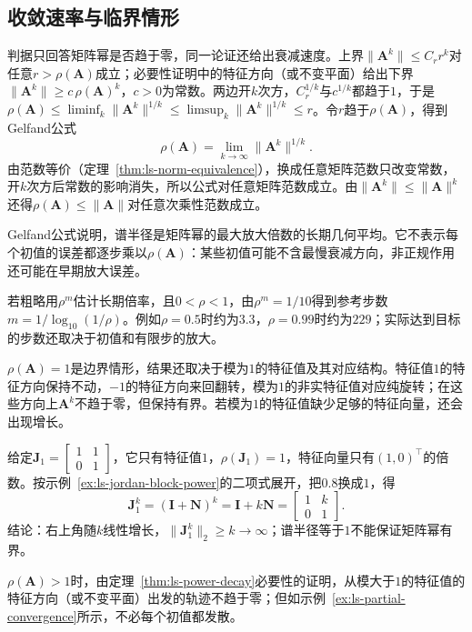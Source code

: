 \subsection{收敛速率与临界情形}

判据只回答矩阵幂是否趋于零，同一论证还给出衰减速度。上界$\lVert\bm A^k\rVert\leq C_rr^k$对任意$r>\rho(\bm A)$成立；必要性证明中的特征方向（或不变平面）给出下界$\lVert\bm A^k\rVert\geq c\,\rho(\bm A)^k$，$c>0$为常数。两边开$k$次方，$C_r^{1/k}$与$c^{1/k}$都趋于$1$，于是$\rho(\bm A)\leq\liminf_k\lVert\bm A^k\rVert^{1/k}\leq\limsup_k\lVert\bm A^k\rVert^{1/k}\leq r$。令$r$趋于$\rho(\bm A)$，得到Gelfand公式
\begin{equation}
 \rho(\bm A)=\lim_{k\to\infty}\lVert\bm A^k\rVert^{1/k}.
 \label{eq:ls-gelfand-formula}
\end{equation}
由范数等价（定理~\ref{thm:ls-norm-equivalence}），换成任意矩阵范数只改变常数，开$k$次方后常数的影响消失，所以公式对任意矩阵范数成立。由$\lVert\bm A^k\rVert\leq\lVert\bm A\rVert^k$还得$\rho(\bm A)\leq\lVert\bm A\rVert$对任意次乘性范数成立。

Gelfand公式说明，谱半径是矩阵幂的最大放大倍数的长期几何平均。它不表示每个初值的误差都逐步乘以$\rho(\bm A)$：某些初值可能不含最慢衰减方向，非正规作用还可能在早期放大误差。

若粗略用$\rho^m$估计长期倍率，且$0<\rho<1$，由$\rho^m=1/10$得到参考步数$m=1/\log_{10}(1/\rho)$。例如$\rho=0.5$时约为$3.3$，$\rho=0.99$时约为$229$；实际达到目标的步数还取决于初值和有限步的放大。

$\rho(\bm A)=1$是边界情形，结果还取决于模为$1$的特征值及其对应结构。特征值$1$的特征方向保持不动，$-1$的特征方向来回翻转，模为$1$的非实特征值对应纯旋转；在这些方向上$\bm A^k$不趋于零，但保持有界。若模为$1$的特征值缺少足够的特征向量，还会出现增长。
\begin{example}
\label{ex:ls-unit-spectral-radius-growth}
给定$\bm J_1=\left[\begin{smallmatrix}1&1\\0&1\end{smallmatrix}\right]$，它只有特征值$1$，$\rho(\bm J_1)=1$，特征向量只有$(1,0)^\top$的倍数。按示例~\ref{ex:ls-jordan-block-power}的二项式展开，把$0.8$换成$1$，得
\[
 \bm J_1^k=(\bm I+\bm N)^k=\bm I+k\bm N=\begin{bmatrix}1&k\\0&1\end{bmatrix}.
\]
结论：右上角随$k$线性增长，$\lVert\bm J_1^k\rVert_2\geq k\to\infty$；谱半径等于$1$不能保证矩阵幂有界。
\end{example}
$\rho(\bm A)>1$时，由定理~\ref{thm:ls-power-decay}必要性的证明，从模大于$1$的特征值的特征方向（或不变平面）出发的轨迹不趋于零；但如示例~\ref{ex:ls-partial-convergence}所示，不必每个初值都发散。

